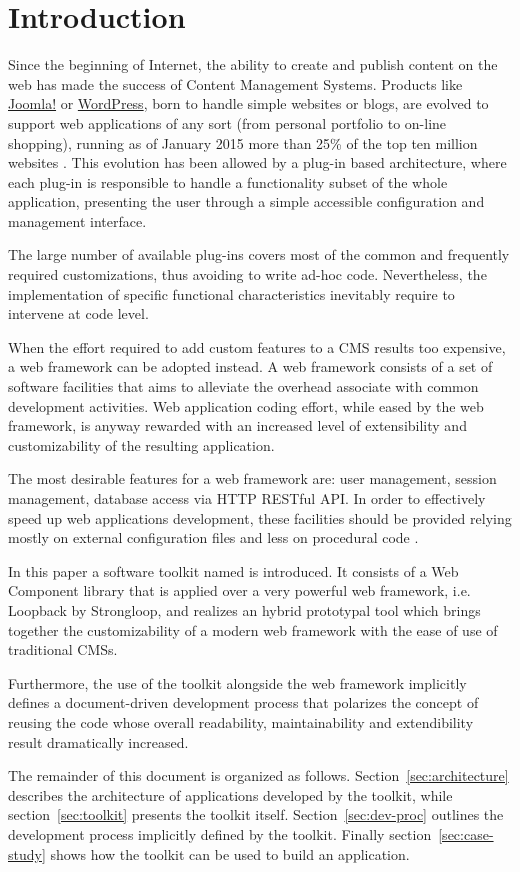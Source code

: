 \section{Introduction}\label{sec:introduction}

Since the beginning of Internet, the ability to create and publish content on the web has made the success of Content Management Systems. Products like \href{http://www.joomla.org/}{Joomla!} or \href{https://wordpress.org/}{WordPress}, born to handle simple websites or blogs, are evolved to support web applications of any sort (from personal portfolio to on-line shopping), running as of January 2015 more than 25\% of the top ten million websites \cite{usage-cms}. This evolution has been allowed by a plug-in based architecture, where each plug-in is responsible to handle a functionality subset of the whole application, presenting the user through a simple accessible configuration and management interface.

The large number of available plug-ins covers most of the common and frequently required customizations, thus avoiding to write ad-hoc code. Nevertheless, the implementation of specific functional characteristics inevitably require to intervene at code level.

When the effort required to add custom features to a CMS results too expensive, a web framework can be adopted instead. A web framework consists of a set of software facilities that aims to alleviate the overhead associate with common development activities. Web application coding effort, while eased by the web framework, is anyway rewarded with an increased level of extensibility and customizability of the resulting application.

The most desirable features for a web framework are: user management, session management, database access via HTTP RESTful API. In order to effectively speed up web applications development, these facilities should be provided relying mostly on external configuration files and less on procedural code \cite{6859693}.

In this paper a software toolkit named  is introduced. It consists of a Web Component library that is applied over a very powerful web framework, i.e. Loopback by Strongloop, and realizes an hybrid prototypal tool which brings together the customizability of a modern web framework with the ease of use of traditional CMSs.

Furthermore, the use of the toolkit alongside the web framework implicitly defines a document-driven development process that polarizes the concept of reusing the code whose overall readability, maintainability and extendibility result dramatically increased.

The remainder of this document is organized as follows. Section~\ref{sec:architecture} describes the architecture of applications developed by the  toolkit, while section~\ref{sec:toolkit} presents the toolkit itself. Section~\ref{sec:dev-proc} outlines the development process implicitly defined by the toolkit. Finally section~\ref{sec:case-study} shows how the toolkit can be used to build an application.

